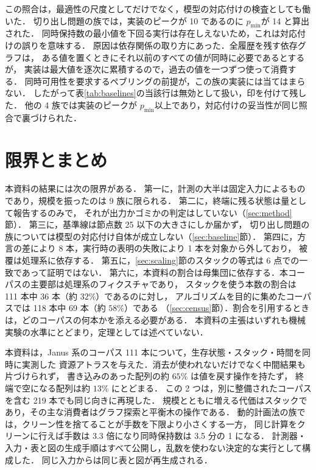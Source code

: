 \documentclass[a4paper,11pt]{jsarticle}
\newcommand{\pmin}{\ensuremath{p_{\min}}}
\begin{document}
この照合は，最適性の尺度としてだけでなく，模型の対応付けの検査としても働いた．
切り出し問題の族では，実装のピークが 10 であるのに \pmin が 14 と算出された．
同時保持数の最小値を下回る実行は存在しえないため，これは対応付けの誤りを意味する．
原因は依存関係の取り方にあった．全履歴を残す依存グラフは，
ある値を置くときにそれ以前のすべての値が同時に必要であるとするが，
実装は最大値を逐次に累積するので，過去の値を一つずつ使って消費する．
同時可用性を要求するペブリングの前提が，この族の実装には当てはまらない．
したがって表\ref{tab:baselines}の当該行は無効として扱い，印を付けて残した．
他の 4 族では実装のピークが \pmin 以上であり，対応付けの妥当性が同じ照合で裏づけられた．

\section{限界とまとめ}\label{sec:conclusion}

本資料の結果には次の限界がある．
第一に，計測の大半は固定入力によるものであり，規模を振ったのは 9 族に限られる．
第二に，終端に残る状態は量として報告するのみで，
それが出力かゴミかの判定はしていない（\ref{sec:method}節）．
第三に，基準線は節点数 25 以下の大きさにしか届かず，
切り出し問題の族については模型の対応付け自体が成立しない（\ref{sec:baseline}節）．
第四に，方言の差により 8 本，実行時の表明の失敗により 1 本を対象から外しており，
被覆は処理系に依存する．
第五に，\ref{sec:scaling}節のスタックの等式は 6 点での一致であって証明ではない．
第六に，本資料の割合は母集団に依存する．本コーパスの主要部は処理系のフィクスチャであり，
スタックを使う本数の割合は 111 本中 36 本（約 $32\%$）であるのに対し，
アルゴリズムを目的に集めたコーパスでは 118 本中 69 本（約 $58\%$）である
（\ref{sec:census}節）．割合を引用するときは，どのコーパスの何本かを添える必要がある．
本資料の主張はいずれも機械実験の水準にとどまり，定理としては述べていない．

本資料は，Janus 系のコーパス 111 本について，生存状態・スタック・時間を同時に実測した
資源アトラスを与えた．消去が使われないだけでなく中間結果も片づけられず，
書き込みのあった配列の約 $65\%$ は値を戻す操作を持たず，
終端で空になる配列は約 $13\%$ にとどまる．
この 2 つは，別に整備されたコーパスを含む 219 本でも同じ向きに再現した．
規模とともに増える代価はスタックであり，その主な消費者はグラフ探索と平衡木の操作である．
動的計画法の族では，クリーン性を捨てることが手数を下限より小さくする一方，
同じ計算をクリーンに行えば手数は 3.3 倍になり同時保持数は 3.5 分の 1 になる．
計測器・入力・表と図の生成手順はすべて公開し，乱数を使わない決定的な実行として構成した．
同じ入力からは同じ表と図が再生成される．
\end{document}

